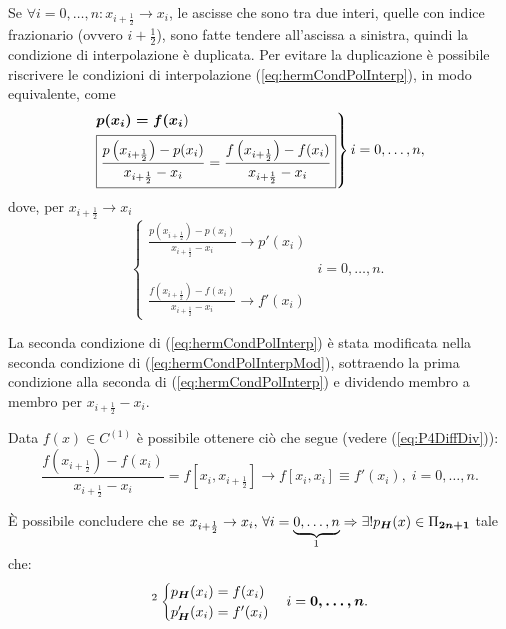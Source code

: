 Se $\forall i=0,\hdots,n: x_{i+\frac{1}{2}}\rightarrow x_i$, le ascisse che sono tra due interi, quelle con indice frazionario (ovvero $i+\frac{1}{2}$), sono fatte tendere all'ascissa a sinistra, quindi la condizione di interpolazione è duplicata. Per evitare la duplicazione è possibile riscrivere le condizioni di interpolazione (\ref{eq:hermCondPolInterp}), in modo equivalente, come
\begin{equation}\label{eq:hermCondPolInterpMod}
    \begin{rcases}
        \boldsymbol{p(x_i)=f(x_i})\\
        \boxed{\frac{p\left(x_{i+\frac{1}{2}}\right)-p(x_i)}{x_{i+\frac{1}{2}}-x_i}=\frac{f\left(x_{i+\frac{1}{2}}\right)-f(x_i)}{x_{i+\frac{1}{2}}-x_i}}
     \end{rcases} i=0,\hdots,n,
\end{equation}
dove, per $x_{i+\frac{1}{2}}\rightarrow x_i$
\begin{equation*}
    \begin{cases}
        \frac{p\left(x_{i+\frac{1}{2}}\right)-p(x_i)}{x_{i+\frac{1}{2}}-x_i}\rightarrow p'(x_i)\\
        & i=0,\hdots, n.\\
        \frac{f\left(x_{i+\frac{1}{2}}\right)-f(x_i)}{x_{i+\frac{1}{2}}-x_i}\rightarrow f'(x_i)
    \end{cases}
\end{equation*}

\begin{remark}
    La seconda condizione di (\ref{eq:hermCondPolInterp}) è stata modificata nella seconda condizione di (\ref{eq:hermCondPolInterpMod}), sottraendo la prima condizione alla seconda di (\ref{eq:hermCondPolInterp}) e dividendo membro a membro per $x_{i+\frac{1}{2}}-x_i$.
\end{remark}

Data $f(x)\in C^{(1)}$ è possibile ottenere ciò che segue (vedere (\ref{eq:P4DiffDiv})):
\begin{equation}\label{eq:equivApproxf'}
    \frac{f\left(x_{i+\frac{1}{2}}\right)-f(x_i)}{x_{i+\frac{1}{2}}-x_i}=f\left[x_i,x_{i+\frac{1}{2}}\right]\rightarrow f[x_i,x_i]\equiv f'(x_i),\; i=0,\hdots,n.
\end{equation}

È possibile concludere che se $x_{i+\frac{1}{2}}\rightarrow x_i,\, \forall i=\underbrace{0,\hdots, n}_{\footnotemark}\Rightarrow\exists! p_{\boldsymbol H}(x)\in\Pi_{\boldsymbol{2n+1}}$ tale che: 
\begin{equation}\label{eq:polInterHer}
    \footnotemark\begin{cases}
        p_{\boldsymbol H}(x_i)=f(x_i)\\
        p_{\boldsymbol H}'(x_i)=f'(x_i)
    \end{cases} i=\boldsymbol{0,\hdots,n}.
\end{equation}

